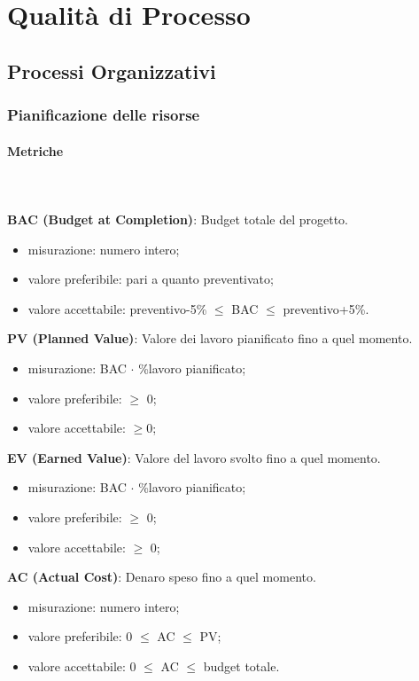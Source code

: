 \section{Qualità di Processo}
	\subsection{Processi Organizzativi}
		\subsubsection{Pianificazione delle risorse}
			\paragraph{Metriche} \mbox{} \\ \\
				\textbf{BAC (Budget at Completion)}: Budget totale del progetto\glo.
				\begin{itemize}
					\item misurazione: numero intero;
					\item valore preferibile: pari a quanto preventivato;
					\item valore accettabile: preventivo-5\% $\le$ BAC $\le$ preventivo+5\%.
				\end{itemize}
				\textbf{PV (Planned Value)}: Valore dei lavoro pianificato fino a quel momento.
				\begin{itemize}
					\item misurazione: BAC $\cdot$ \%lavoro pianificato;
					\item valore preferibile: $\ge$ 0;
					\item valore accettabile: $\ge$0;
				\end{itemize}
				\textbf{EV (Earned Value)}: Valore del lavoro svolto fino a quel momento.
				\begin{itemize}
					\item misurazione: BAC $\cdot$ \%lavoro pianificato;
					\item valore preferibile: $\ge$ 0;
					\item valore accettabile: $\ge$ 0;
				\end{itemize}
				\textbf{AC (Actual Cost)}: Denaro speso fino a quel momento.
				\begin{itemize}
					\item misurazione: numero intero;
					\item valore preferibile: 0 $\le$ AC $\le$ PV;
					\item valore accettabile: 0 $\le$ AC $\le$ budget totale.
				\end{itemize}
